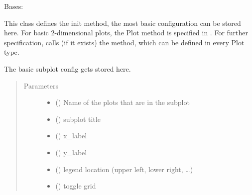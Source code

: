 \documentclass[letterpaper,10pt,english]{sphinxmanual}
\begin{document}
\begin{fulllineitems}
\label{\detokenize{DataAnalyzer.PlotConfig:DataAnalyzer.PlotConfig.plt_Base.Base}}
Bases: 

This class defines the init method, the most basic configuration can be stored here.
For basic 2-dimensional plots, the Plot method is specified in .
For further specification,  calls (if it exists) the  method,
which can be defined in every Plot type.

The basic subplot config gets stored here.
\begin{quote}\begin{description}
\item[{Parameters}] \leavevmode\begin{itemize}
\item {} 
 () \textendash{} Name of the plots that are in the subplot

\item {} 
 () \textendash{} subplot title

\item {} 
 () \textendash{} x\_label

\item {} 
 () \textendash{} y\_label

\item {} 
 () \textendash{} legend location (upper left, lower right, …)

\item {} 
 () \textendash{} toggle grid


\end{itemize}
\end{description}
\end{quote}
\end{fulllineitems}
\end{document}
